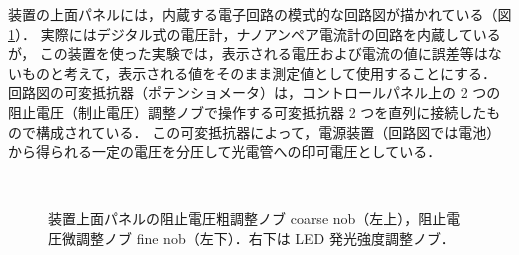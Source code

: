 \documentclass[11pt,sort]{jarticle}
\begin{document}
装置の上面パネルには，内蔵する電子回路の模式的な回路図が描かれている（図\ref{fig:controlpanel}）．
実際にはデジタル式の電圧計，ナノアンペア電流計の回路を内蔵しているが，
この装置を使った実験では，表示される電圧および電流の値に誤差等はないものと考えて，表示される値をそのまま測定値として使用することにする．
回路図の可変抵抗器（ポテンショメータ）は，コントロールパネル上の 2 つの阻止電圧（制止電圧）調整ノブで操作する可変抵抗器 2 つを直列に接続したもので構成されている．
この可変抵抗器によって，電源装置（回路図では電池）から得られる一定の電圧を分圧して光電管への印可電圧としている．

\begin{figure}[t]
\begin{minipage}[t]{.5\textwidth}
\begin{center}
\\
\caption{装置上面パネルの阻止電圧粗調整ノブ coarse nob（左上），阻止電圧微調整ノブ fine nob（左下）．右下は LED 発光強度調整ノブ．}\label{fig:controlpanel} 
\end{center}
\end{minipage}
\hfill
\begin{minipage}[t]{.45\textwidth}

\end{minipage}
\end{figure}
\end{document}
